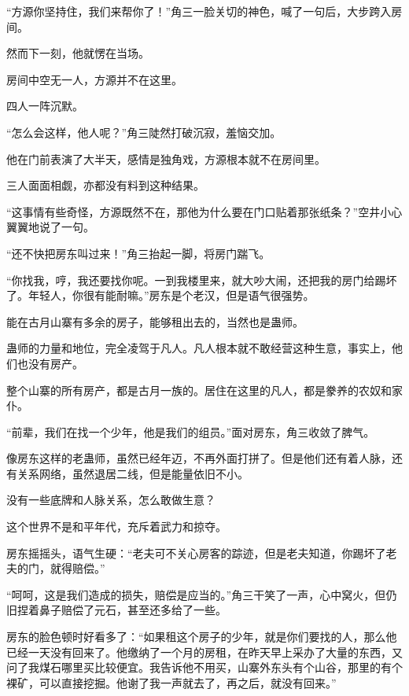 
\begin{this_body}



“方源你坚持住，我们来帮你了！”角三一脸关切的神色，喊了一句后，大步跨入房间。

然而下一刻，他就愣在当场。

房间中空无一人，方源并不在这里。

四人一阵沉默。

“怎么会这样，他人呢？”角三陡然打破沉寂，羞恼交加。

他在门前表演了大半天，感情是独角戏，方源根本就不在房间里。

三人面面相觑，亦都没有料到这种结果。

“这事情有些奇怪，方源既然不在，那他为什么要在门口贴着那张纸条？”空井小心翼翼地说了一句。

“还不快把房东叫过来！”角三抬起一脚，将房门踹飞。

“你找我，哼，我还要找你呢。一到我楼里来，就大吵大闹，还把我的房门给踢坏了。年轻人，你很有能耐嘛。”房东是个老汉，但是语气很强势。

能在古月山寨有多余的房子，能够租出去的，当然也是蛊师。

蛊师的力量和地位，完全凌驾于凡人。凡人根本就不敢经营这种生意，事实上，他们也没有房产。

整个山寨的所有房产，都是古月一族的。居住在这里的凡人，都是豢养的农奴和家仆。

“前辈，我们在找一个少年，他是我们的组员。”面对房东，角三收敛了脾气。

像房东这样的老蛊师，虽然已经年迈，不再外面打拼了。但是他们还有着人脉，还有关系网络，虽然退居二线，但是能量依旧不小。

没有一些底牌和人脉关系，怎么敢做生意？

这个世界不是和平年代，充斥着武力和掠夺。

房东摇摇头，语气生硬：“老夫可不关心房客的踪迹，但是老夫知道，你踢坏了老夫的门，就得赔偿。”

“呵呵，这是我们造成的损失，赔偿是应当的。”角三干笑了一声，心中窝火，但仍旧捏着鼻子赔偿了元石，甚至还多给了一些。

房东的脸色顿时好看多了：“如果租这个房子的少年，就是你们要找的人，那么他已经一天没有回来了。他缴纳了一个月的房租，在昨天早上采办了大量的东西，又问了我煤石哪里买比较便宜。我告诉他不用买，山寨外东头有个山谷，那里的有个裸矿，可以直接挖掘。他谢了我一声就去了，再之后，就没有回来。”


\end{this_body}
